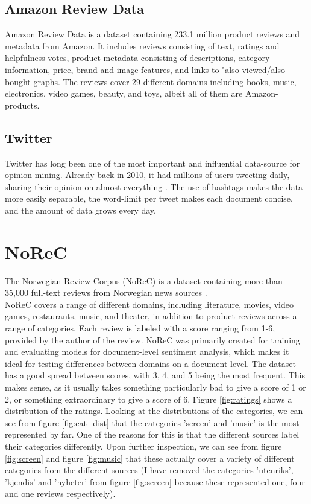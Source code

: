 \documentclass{report}
\begin{document}
\subsection{Amazon Review Data}
Amazon Review Data \cite{ni2019justifying} is a dataset containing 233.1 million product reviews and metadata from Amazon. It includes reviews consisting of text, ratings and helpfulness votes, product metadata consisting of descriptions, category information, price, brand and image features, and links to "also viewed/also bought graphs. The reviews cover 29 different domains including books, music, electronics, video games, beauty, and toys, albeit all of them are Amazon-products.
\subsection{Twitter}
Twitter has long been one of the most important and influential data-source for opinion mining. Already back in 2010, it had millions of users tweeting daily, sharing their opinion on almost everything \cite{pak-paroubek-2010-twitter}. The use of hashtags makes the data more easily separable, the word-limit per tweet makes each document concise, and the amount of data grows every day.



\section{NoReC}
The Norwegian Review Corpus (NoReC) is a dataset containing more than 35,000 full-text reviews from Norwegian news sources \cite{11509/124}.\\
NoReC covers a range of different domains, including literature, movies, video games, restaurants, music, and theater, in addition to product reviews across a range of categories. Each review is labeled with a score ranging from 1-6, provided by the author of the review. NoReC was primarily created for training and evaluating models for document-level sentiment analysis, which makes it ideal for testing differences between domains on a document-level. The dataset has a good spread between scores, with 3, 4, and 5 being the most frequent. This makes sense, as it usually takes something particularly bad to give a score of 1 or 2, or something extraordinary to give a score of 6. Figure \ref{fig:ratings} shows a distribution of the ratings. Looking at the distributions of the categories, we can see from figure \ref{fig:cat_dist} that the categories 'screen' and 'music' is the most represented by far. One of the reasons for this is that the different sources label their categories differently. Upon further inspection, we can see from figure \ref{fig:screen} and figure \ref{fig:music} that these actually cover a variety of different categories from the different sources (I have removed the categories 'utenriks', 'kjendis' and 'nyheter' from figure \ref{fig:screen} because these represented one, four and one reviews respectively).
\end{document}
